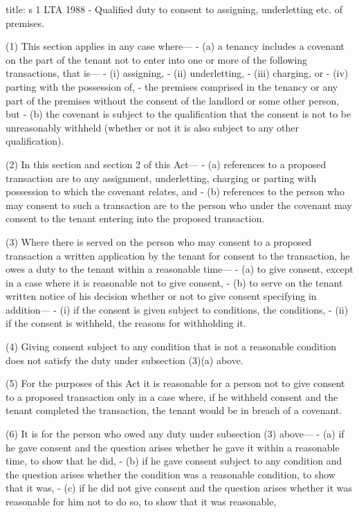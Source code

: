 \documentclass[
]{article}
\newenvironment{Shaded}{}{}
\newcommand{\NormalTok}[1]{#1}
\begin{document}
\begin{Shaded}
\begin{Highlighting}[]
\NormalTok{title: s 1 LTA 1988 {-} Qualified duty to consent to assigning, underletting etc. of premises.}

\NormalTok{(1) This section applies in any case where—}
\NormalTok{{-} (a) a tenancy includes a covenant on the part of the tenant not to enter into one or more of the following transactions, that is—}
\NormalTok{    {-} (i) assigning,}
\NormalTok{    {-} (ii) underletting,}
\NormalTok{    {-} (iii) charging, or}
\NormalTok{    {-} (iv) parting with the possession of,}
\NormalTok{{-} the premises comprised in the tenancy or any part of the premises without the consent of the landlord or some other person, but}
\NormalTok{{-} (b) the covenant is subject to the qualification that the consent is not to be unreasonably withheld (whether or not it is also subject to any other qualification).}

\NormalTok{(2) In this section and section 2 of this Act—}
\NormalTok{{-} (a) references to a proposed transaction are to any assignment, underletting, charging or parting with possession to which the covenant relates, and}
\NormalTok{{-} (b) references to the person who may consent to such a transaction are to the person who under the covenant may consent to the tenant entering into the proposed transaction.}

\NormalTok{(3) Where there is served on the person who may consent to a proposed transaction a written application by the tenant for consent to the transaction, he owes a duty to the tenant within a reasonable time—}
\NormalTok{{-} (a) to give consent, except in a case where it is reasonable not to give consent,}
\NormalTok{{-} (b) to serve on the tenant written notice of his decision whether or not to give consent specifying in addition—}
\NormalTok{    {-} (i) if the consent is given subject to conditions, the conditions,}
\NormalTok{    {-} (ii) if the consent is withheld, the reasons for withholding it.}

\NormalTok{(4) Giving consent subject to any condition that is not a reasonable condition does not satisfy the duty under subsection (3)(a) above.}

\NormalTok{(5) For the purposes of this Act it is reasonable for a person not to give consent to a proposed transaction only in a case where, if he withheld consent and the tenant completed the transaction, the tenant would be in breach of a covenant.}

\NormalTok{(6) It is for the person who owed any duty under subsection (3) above—}
\NormalTok{{-} (a) if he gave consent and the question arises whether he gave it within a reasonable time, to show that he did,}
\NormalTok{{-} (b) if he gave consent subject to any condition and the question arises whether the condition was a reasonable condition, to show that it was,}
\NormalTok{{-} (c) if he did not give consent and the question arises whether it was reasonable for him not to do so, to show that it was reasonable,}


\end{Highlighting}
\end{Shaded}
\end{document}
